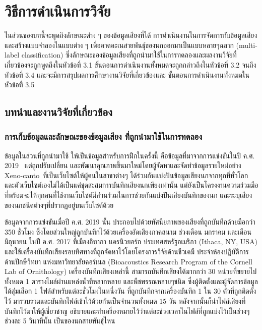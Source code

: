 \chapter{วิธีการดำเนินการวิจัย}
\label{chapter:experiment}

ในส่วนของบทนี้จะพูดถึงลักษณะต่าง ๆ ของข้อมูลเสียงที่ได้ การดำเนินงานในการจัดการกับข้อมูลเสียง 
และสร้างแบบจำลองในแบบต่าง ๆ เพื่อคาดคะเนสายพันธุ์ของนกออกมาเป็นแบบหลายๆฉลาก (multi-label classification) 
ซึ่งลักษณะของข้อมูลเสียงที่ถูกนำมาใช้ในการทดลองและผลงานวิจัยที่เกี่ยวข้องจะถูกพูดถึงในหัวข้อที่ 3.1 
ขั้นตอนการดำเนินงานทั้งหมดจะถูกกล่าวถึงในหัวข้อที่ 3.2 จนถึง หัวข้อที่ 3.4 และจะมีการสรุปผลการศึกษางานวิจัยที่เกี่ยวข้องและ
ขั้นตอนการดำเนินงานทั้งหมดในหัวข้อที่ 3.5

\section{บทนำและงานวิจัยที่เกี่ยวข้อง}
\subsection{การเก็บข้อมูลและลักษณะของข้อมูลเสียง ที่ถูกนำมาใช้ในการทดลอง}
ข้อมูลในส่วนที่ถูกนำมาใช้ ให้เป็นข้อมูลสำหรับการฝึกในครั้งนี้ คือข้อมูลที่มาจากการแข่งขันในปี ค.ศ. 2019~\cite{Kahl2019} แต่ถูกปรับเปลี่ยน 
และพัฒนาคุณภาพขึ้นมาใหม่โดยผู้จัดหาและจัดทำข้อมูลรายใหม่อย่าง Xeno-canto~\cite{xeno-canto}ที่เป็นเว็บไซต์ให้ผู้คนในสาขาต่างๆ ได้ร่วมกันแบ่งปันข้อมูลเสียงนกจากทุกที่ทั่วโลก 
และตัวเว็บไซต์เองไม่ได้เป็นแค่ชุดสะสมการบันทึกเสียงนกเพียงเท่านั้น แต่ยังเป็นโครงงานความร่วมมือที่พร้อมจะให้ทุกคนที่ใช้งานเว็บไซต์มีส่วนร่วมในการช่วยกันแบ่งปันเสียงบันทึกของนก 
และระบุเสียงของนกชนิดต่างๆที่ปรากฏอยู่บนเว็บไซต์ด้วย \par

ข้อมูลจากการแข่งขันเมื่อปี ค.ศ. 2019 นั้น ประกอบไปด้วยทัศนียภาพของเสียงที่ถูกบันทึกด้วยมือกว่า 350 ชั่วโมง ซึ่งโดยส่วนใหญ่ถูกบันทึกไว้ด้วยเครื่องอัดเสียงภาคสนาม 
ช่วงเดือน มกราคม และเดือนมิถุนายน ในปี ค.ศ. 2017 ที่เมืองอิทากา นครนิวยอร์ก ประเทศสหรัฐอเมริกา (Ithaca, NY, USA) และใช้เครื่องบันทึกเสียงรอบทิศทางที่ถูกจัดหาไว้โดยโครงการวิจัยด้านชีวเคมี 
ประจำห้องปฏิบัติการด้านปักษีวิทยา แห่งมหาวิทยาลัยคอร์เนล (Bioacoustics Research Program of the Cornell Lab of Ornithology) 
เครื่องบันทึกเสียงเหล่านี้ สามารถบันทึกเสียงได้มากกว่า 30 หน่วยที่ขยายไปทั้งหมด 1 ตารางไมล์ผ่านแหล่งน้ำที่หลากหลาย และพืชพรรณหลายๆชนิด ซึ่งผู้ติดตั้งและผู้จัดการข้อมูลได้สุ่มเลือก 1 ไฟล์สำหรับแต่ละชั่วโมงในหนึ่งวัน ที่ถูกบันทึกจากเครื่องบันทึก 1 
ใน 30 ตัวที่ถูกติดตั้งไว้ มารวบรวมและบันทึกไฟล์เข้าไว้ด้วยกันเป็นจำนวนทั้งหมด 15 วัน หลังจากนั้นก็นำไฟล์เสียงที่บันทึกไว้มาให้ผู้เชี่ยวชาญ อธิบายและทำเครื่องหมายไว้ว่าแต่ละช่วงเวลาในไฟล์ที่ถูกแบ่งไว้เป็นช่วงๆ ช่วงละ 5 วินาทีนั้น เป็นของนกสายพันธุ์ไหน \par

